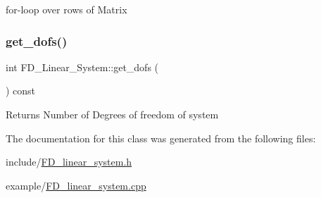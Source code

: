 for-\/loop over rows of Matrix \mbox{\label{classFD__Linear__System_a751694ea10d32e771355bd849851a3e9}} 
\subsubsection{\texorpdfstring{get\+\_\+dofs()}{get\_dofs()}}
{\footnotesize\ttfamily int F\+D\+\_\+\+Linear\+\_\+\+System\+::get\+\_\+dofs (\begin{DoxyParamCaption}{ }\end{DoxyParamCaption}) const\hspace{0.3cm}{\ttfamily [inline]}}

\begin{DoxyReturn}{Returns}
Number of Degrees of freedom of system 
\end{DoxyReturn}


The documentation for this class was generated from the following files\+:\begin{DoxyCompactItemize}
\item 
include/\mbox{\hyperlink{FD__linear__system_8h}{F\+D\+\_\+linear\+\_\+system.\+h}}\item 
example/\mbox{\hyperlink{FD__linear__system_8cpp}{F\+D\+\_\+linear\+\_\+system.\+cpp}}\end{DoxyCompactItemize}
